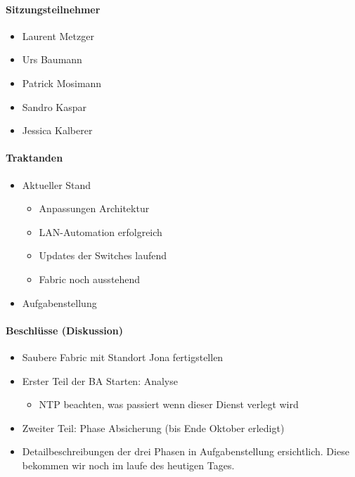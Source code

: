 \paragraph{Sitzungsteilnehmer}
\begin{itemize}	
	\item Laurent Metzger 
	\item Urs Baumann 
	\item Patrick Mosimann
	\item Sandro Kaspar
	\item Jessica Kalberer
\end{itemize}

\paragraph{Traktanden}
\begin{itemize}	
	\item Aktueller Stand 
	\begin{itemize}
		\item Anpassungen Architektur
		\item LAN-Automation erfolgreich
		\item Updates der Switches laufend
		\item Fabric noch ausstehend
	\end{itemize}
	\item Aufgabenstellung	
\end{itemize}

\paragraph{Beschlüsse (Diskussion)}
\begin{itemize}	
	\item Saubere Fabric mit Standort Jona fertigstellen
	\item Erster Teil der BA Starten: Analyse
	\begin{itemize}
		\item NTP beachten, was passiert wenn dieser Dienst verlegt wird
	\end{itemize}
	\item Zweiter Teil: Phase Absicherung (bis Ende Oktober erledigt)
	\item Detailbeschreibungen der drei Phasen in Aufgabenstellung ersichtlich. Diese bekommen wir noch im laufe des heutigen Tages.
\end{itemize}

